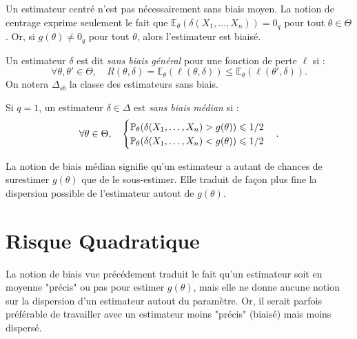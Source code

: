 \begin{remark}
    Un estimateur centré n'est pas nécessairement sans biais moyen. La notion de centrage exprime 
    seulement le fait que $ \mathbb{E}_\theta( \delta(X_1, \dots, X_n)) = 0_q $ pour tout 
    $ \theta \in \Theta$. Or, si $ g(\theta) \not = 0_q$ pour tout $ \theta$, alors 
    l'estimateur est biaisé. 
\end{remark}

\begin{definition}
    Un estimateur $ \delta$ est dit \emph{sans biais général} pour une fonction de perte $ \ell$ si : 
        $$ \forall \theta, \theta' \in \Theta, \quad 
            R(\theta, \delta) = \mathbb{E}_\theta( \ell(\theta, \delta)) \leqslant \mathbb{E}_\theta(\ell(\theta', \delta)).
        $$
    On notera $ \Delta_{sb}$ la classe des estimateurs sans biais. 
\end{definition}

\begin{definition}
    Si $ q = 1$, un estimateur $ \delta \in \Delta$ est \emph{sans biais médian} si : 
        $$ \forall \theta \in \Theta, \quad 
            \begin{cases}
                \mathbb{P}_\theta( \delta(X_1, \dots, X_n) > g(\theta)) \leqslant 1/2 \\
                \mathbb{P}_\theta( \delta(X_1, \dots, X_n) < g(\theta)) \leqslant 1/2
            \end{cases}.
        $$
\end{definition}

La notion de biais médian signifie qu'un estimateur a autant de chances de surestimer $ g(\theta)$ que 
de le sous-estimer. Elle traduit de façon plus fine la dispersion possible de l'estimateur 
autout de $ g(\theta)$. 




\section{Risque Quadratique}

La notion de biais vue précédement traduit le fait qu'un estimateur soit en moyenne 
"précis" ou pas pour estimer $ g(\theta)$, mais elle ne donne aucune notion sur 
la dispersion d'un estimateur autout du paramètre. Or, il serait parfois préférable 
de travailler avec un estimateur moins "précis" (biaisé) mais moins dispersé. 


